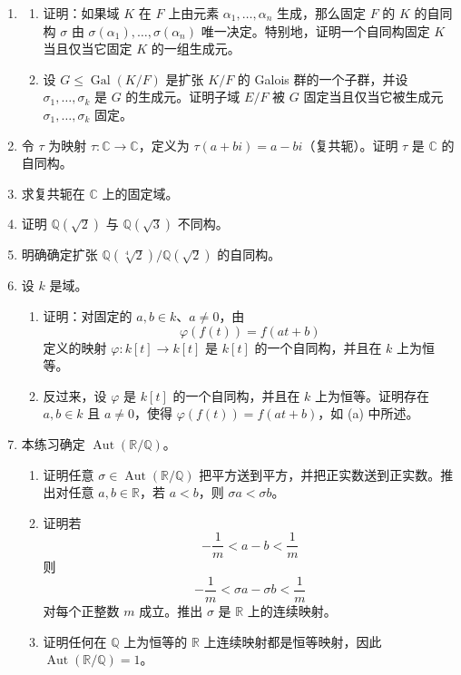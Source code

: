 \begin{enumerate}[label=\arabic*.]
\item
\begin{enumerate}[label=(\alph*)]
\item 证明：如果域 $K$ 在 $F$ 上由元素 $\alpha_1,\ldots,\alpha_n$ 生成，那么固定 $F$ 的 $K$ 的自同构 $\sigma$ 由 $\sigma(\alpha_1),\ldots,\sigma(\alpha_n)$ 唯一决定。特别地，证明一个自同构固定 $K$ 当且仅当它固定 $K$ 的一组生成元。
\item 设 $G\leq \operatorname{Gal}(K/F)$ 是扩张 $K/F$ 的 Galois 群的一个子群，并设 $\sigma_1,\ldots,\sigma_k$ 是 $G$ 的生成元。证明子域 $E/F$ 被 $G$ 固定当且仅当它被生成元 $\sigma_1,\ldots,\sigma_k$ 固定。
\end{enumerate}

\item 令 $\tau$ 为映射 $\tau:\mathbb C\to\mathbb C$，定义为 $\tau(a+bi)=a-bi$（复共轭）。证明 $\tau$ 是 $\mathbb C$ 的自同构。

\item 求复共轭在 $\mathbb C$ 上的固定域。

\item 证明 $\mathbb Q(\sqrt2)$ 与 $\mathbb Q(\sqrt3)$ 不同构。

\item 明确确定扩张 $\mathbb Q(\sqrt[4]{2})/\mathbb Q(\sqrt2)$ 的自同构。

\item 设 $k$ 是域。
\begin{enumerate}[label=(\alph*)]
\item 证明：对固定的 $a,b\in k$、$a\neq0$，由
\[
\varphi(f(t))=f(at+b)
\]
定义的映射 $\varphi:k[t]\to k[t]$ 是 $k[t]$ 的一个自同构，并且在 $k$ 上为恒等。
\item 反过来，设 $\varphi$ 是 $k[t]$ 的一个自同构，并且在 $k$ 上为恒等。证明存在 $a,b\in k$ 且 $a\neq0$，使得 $\varphi(f(t))=f(at+b)$，如 (a) 中所述。
\end{enumerate}

\item 本练习确定 $\operatorname{Aut}(\mathbb R/\mathbb Q)$。
\begin{enumerate}[label=(\alph*)]
\item 证明任意 $\sigma\in\operatorname{Aut}(\mathbb R/\mathbb Q)$ 把平方送到平方，并把正实数送到正实数。推出对任意 $a,b\in\mathbb R$，若 $a<b$，则 $\sigma a<\sigma b$。
\item 证明若
\[
-\frac1m<a-b<\frac1m
\]
则
\[
-\frac1m<\sigma a-\sigma b<\frac1m
\]
对每个正整数 $m$ 成立。推出 $\sigma$ 是 $\mathbb R$ 上的连续映射。
\item 证明任何在 $\mathbb Q$ 上为恒等的 $\mathbb R$ 上连续映射都是恒等映射，因此 $\operatorname{Aut}(\mathbb R/\mathbb Q)=1$。
\end{enumerate}


\end{enumerate}
